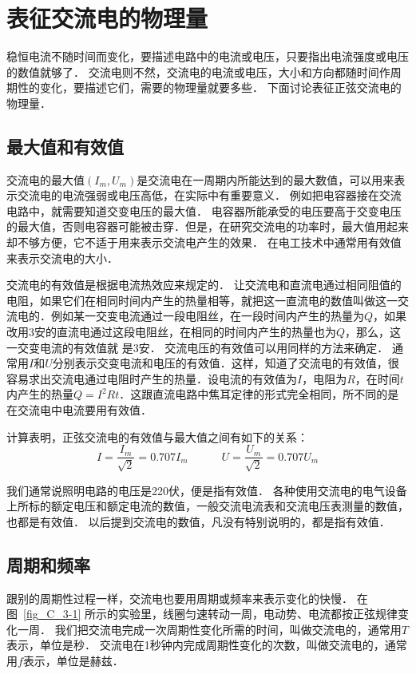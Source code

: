\section{表征交流电的物理量}

稳恒电流不随时间而变化，要描述电路中的电流或电压，只要指出电流强度或电压的数值就够了．
交流电则不然，交流电的电流或电压，大小和方向都随时间作周期性的变化，要描述它们，需要的物理量就要多些．
下面讨论表征正弦交流电的物理量．

\subsection{最大值和有效值}

交流电的最大值$(I_m,U_m)$是交流电在一周期内所能达到的最大数值，可以用来表示交流电的电流强弱或电压高低，在实际中有重要意义．
例如把电容器接在交流电路中，就需要知道交变电压的最大值．
电容器所能承受的电压要高于交变电压的最大值，否则电容器可能被击穿．但是，在研究交流电的功率时，最大值用起来却不够方便，它不适于用来表示交流电产生的效果．
在电工技术中通常用有效值来表示交流电的大小．

交流电的有效值是根据电流热效应来规定的．
让交流电和直流电通过相同阻值的电阻，如果它们在相同时间内产生的热量相等，就把这一直流电的数值叫做这一交流电的．例如某一交变电流通过一段电阻丝，在一段时间内产生的热量为$Q$，如果改用3安的直流电通过这段电阻丝，在相同的时间内产生的热量也为$Q$，那么，这一交变电流的有效值就
是3安．
交流电压的有效值可以用同样的方法来确定．
通常用$I$和$U$分别表示交变电流和电压的有效值．这样，知道了交流电的有效值，很容易求出交流电通过电阻时产生的热量．设电流的有效值为$I$，电阻为$R$，在时间$t$内产生的热量$Q=I^2Rt$．这跟直流电路中焦耳定律的形式完全相同，所不同的是在交流电中电流要用有效值．

计算表明，正弦交流电的有效值与最大值之间有如下的关系：
\[
   I=\frac{I_m}{\sqrt{2}}=0.707I_m
    \qquad  \quad 
   U=\frac{U_m}{\sqrt{2}}=0.707U_m 
\]

我们通常说照明电路的电压是220伏，便是指有效值．
各种使用交流电的电气设备上所标的额定电压和额定电流的数值，一般交流电流表和交流电压表测量的数值，也都是有效值．
以后提到交流电的数值，凡没有特别说明的，都是指有效值．

\subsection{周期和频率}

跟别的周期性过程一样，交流电也要用周期或频率来表示变化的快慢．
在图~\ref{fig_C_3-1} 所示的实验里，线圈匀速转动一周，电动势、电流都按正弦规律变化一周．
我们把交流电完成一次周期性变化所需的时间，叫做交流电的，通常用$T$表示，单位是秒．
交流电在1秒钟内完成周期性变化的次数，叫做交流电的，通常用$f$表示，单位是赫兹．

